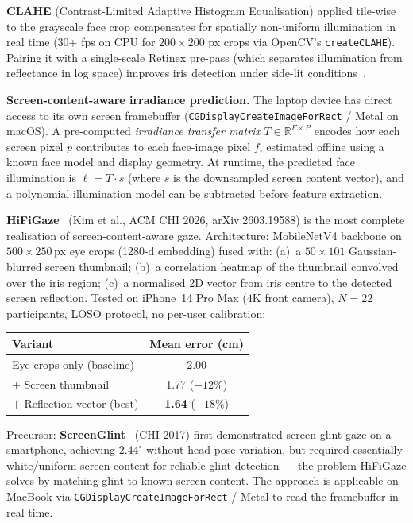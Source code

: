 \documentclass[11pt,a4paper]{article}
\begin{document}
\textbf{CLAHE} (Contrast-Limited Adaptive Histogram Equalisation) applied tile-wise
to the grayscale face crop compensates for spatially non-uniform illumination in
real time ($30$+ fps on CPU for $200\times200$ px crops via OpenCV's \texttt{createCLAHE}).
Pairing it with a single-scale Retinex pre-pass (which separates illumination from
reflectance in log space) improves iris detection under side-lit
conditions~\cite{hamid2014retinex}.

\textbf{Screen-content-aware irradiance prediction.}
The laptop device has direct access to its own screen framebuffer
(\texttt{CGDisplayCreateImageForRect} / Metal on macOS).
A pre-computed \emph{irradiance transfer matrix} $T \in \mathbb{R}^{F \times P}$
encodes how each screen pixel $p$ contributes to each face-image pixel $f$,
estimated offline using a known face model and display geometry.
At runtime, the predicted face illumination is $\ell = T \cdot s$
(where $s$ is the downsampled screen content vector), and a polynomial
illumination model can be subtracted before feature extraction.

\textbf{HiFiGaze}~\cite{hifigaze2025} (Kim et al., ACM CHI 2026, arXiv:2603.19588)
is the most complete realisation of screen-content-aware gaze.
Architecture: MobileNetV4 backbone on $500\times250\,\text{px}$ eye crops (1280-d embedding)
fused with: (a)~a $50\times101$ Gaussian-blurred screen thumbnail;
(b)~a correlation heatmap of the thumbnail convolved over the iris region;
(c)~a normalised 2D vector from iris centre to the detected screen reflection.
Tested on iPhone~14 Pro Max ($4\text{K}$ front camera), $N=22$ participants,
LOSO protocol, no per-user calibration:

\begin{center}
\begin{tabular}{lc}
\hline
\textbf{Variant} & \textbf{Mean error (cm)} \\
\hline
Eye crops only (baseline) & 2.00 \\
+ Screen thumbnail & 1.77 ($-12\%$) \\
+ Reflection vector (best) & \textbf{1.64} ($-18\%$) \\
\hline
\end{tabular}
\end{center}

Precursor: \textbf{ScreenGlint}~\cite{screenglint2017} (CHI 2017) first demonstrated
screen-glint gaze on a smartphone, achieving $2.44^\circ$ without head pose variation,
but required essentially white/uniform screen content for reliable glint detection ---
the problem HiFiGaze solves by matching glint to known screen content.
The approach is applicable on MacBook via \texttt{CGDisplayCreateImageForRect} / Metal
to read the framebuffer in real time.
\end{document}
